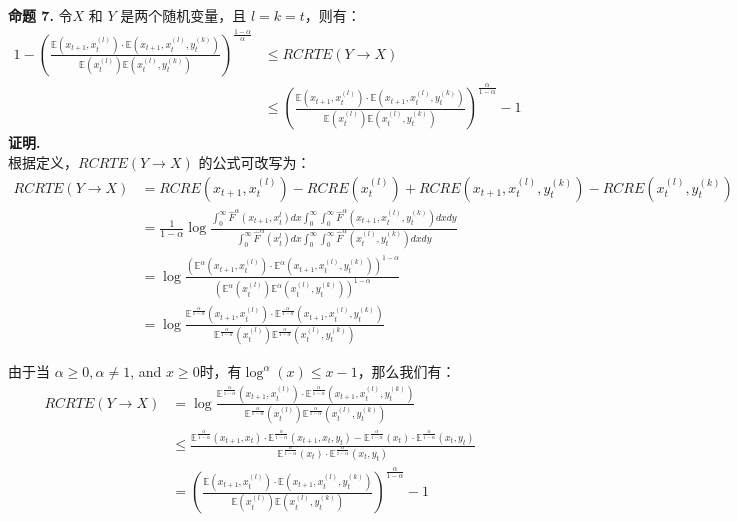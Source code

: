 \textbf{命题 7.} 令$X$ 和 $Y$ 是两个随机变量，且 $l=k=t$，则有：
\begin{align*}1- (\frac{\mathbb{E}(x_{t+1},x_{t}^{(l)})\cdot \mathbb{E}(x_{t+1},x_{t}^{(l)},y_{t}^{(k)})}{\mathbb{E}(x_{t}^{(l)})\mathbb{E}(x_{t}^{(l)},y_{t}^{(k)})})^{\frac{1-\alpha}{\alpha}} &\leq RCRTE(Y \rightarrow X)\\ &\leq (\frac{\mathbb{E}(x_{t+1},x_{t}^{(l)})\cdot \mathbb{E}(x_{t+1},x_{t}^{(l)},y_{t}^{(k)})}{\mathbb{E}(x_{t}^{(l)})\mathbb{E}(x_{t}^{(l)},y_{t}^{(k)})})^{\frac{\alpha}{1-\alpha}}-1
\end{align*}
\textbf{证明.}\\
根据定义，$RCRTE(Y\rightarrow X)$ 的公式可改写为：
\begin{align*}
RCRTE(Y \rightarrow X)&=RCRE(x_{t+1},x_{t}^{(l)})-RCRE(x_{t}^{(l)})+RCRE(x_{t+1},x_{t}^{(l)},y_{t}^{(k)})-RCRE(x_{t}^{(l)},y_{t}^{(k)})\\
&=\frac{1}{1-\alpha}\log \frac{\int_{0}^{\infty}\hat F^{\alpha}(x_{t+1},x_{t}^{l})dx \int_{0}^{\infty}\int_{0}^{\infty}\hat F^{\alpha}(x_{t+1},x_{t}^{(l)},y_{t}^{(k)})dxdy}{\int_{0}^{\infty}\hat F^{\alpha}(x_{t}^{l})dx \int_{0}^{\infty}\int_{0}^{\infty}\hat F^{\alpha}(x_{t}^{(l)},y_{t}^{(k)})dxdy}\\
&= \log \frac{(\mathbb{E}^{\alpha}(x_{t+1},x_{t}^{(l)})\cdot \mathbb{E}^{\alpha}(x_{t+1},x_{t}^{(l)},y_{t}^{(k)}))^{1-\alpha}}{(\mathbb{E}^{\alpha}(x_{t}^{(l)})\mathbb{E}^{\alpha}(x_{t}^{(l)},y_{t}^{(k)}))^{1-\alpha}}\\
&= \log \frac{\mathbb{E}^{\frac{\alpha}{1-\alpha}}(x_{t+1},x_{t}^{(l)})\cdot \mathbb{E}^{\frac{\alpha}{1-\alpha}}(x_{t+1},x_{t}^{(l)},y_{t}^{(k)})}{\mathbb{E}^{\frac{\alpha}{1-\alpha}}(x_{t}^{(l)})\mathbb{E}^{\frac{\alpha}{1-\alpha}}(x_{t}^{(l)},y_{t}^{(k)})}
\end{align*}

由于当 $\alpha \ge 0, \alpha \neq 1$, and $x\ge0$时，有$\log^{\alpha}(x)\leq x-1$，那么我们有：
\begin{align*}
RCRTE(Y \rightarrow X)&= \log \frac{\mathbb{E}^{\frac{\alpha}{1-\alpha}}(x_{t+1},x_{t}^{(l)})\cdot \mathbb{E}^{\frac{\alpha}{1-\alpha}}(x_{t+1},x_{t}^{(l)},y_{t}^{(k)})}{\mathbb{E}^{\frac{\alpha}{1-\alpha}}(x_{t}^{(l)})\mathbb{E}^{\frac{\alpha}{1-\alpha}}(x_{t}^{(l)},y_{t}^{(k)})}\\
& \leq \frac{\mathbb{E}^{\frac{\alpha}{1-\alpha}}(x_{t+1},x_{t})\cdot \mathbb{E}^{\frac{\alpha}{1-\alpha}}(x_{t+1},x_{t},y_{t})-\mathbb{E}^{\frac{\alpha}{1-\alpha}}(x_{t})\cdot \mathbb{E}^{\frac{\alpha}{1-\alpha}}(x_{t},y_{t})}{\mathbb{E}^{\frac{\alpha}{1-\alpha}}(x_{t})\cdot \mathbb{E}^{\frac{\alpha}{1-\alpha}}(x_{t},y_{t})}\\
&=(\frac{\mathbb{E}(x_{t+1},x_{t}^{(l)})\cdot \mathbb{E}(x_{t+1},x_{t}^{(l)},y_{t}^{(k)})}{\mathbb{E}(x_{t}^{(l)})\mathbb{E}(x_{t}^{(l)},y_{t}^{(k)})})^{\frac{\alpha}{1-\alpha}}-1
\end{align*}

